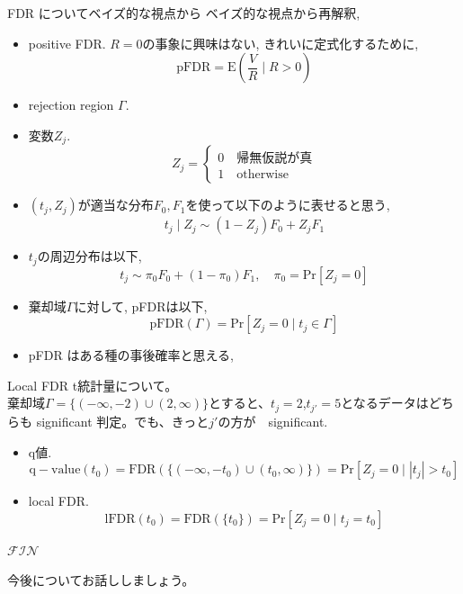 \documentclass[dvipdfmx,8pt]{beamer}
\newcommand{\probability}[1]{\mathrm{Pr}[{#1}]}
\begin{document}
  \begin{frame}{FDR についてベイズ的な視点から}
    ベイズ的な視点から再解釈,
    \begin{itemize}
      \item positive FDR. $R=0$の事象に興味はない, きれいに定式化するために,
        \[
          \mathrm{pFDR}=\mathrm{E}\left(\frac{V}{R}\mid R>0\right)
        \]
      \item rejection region $\Gamma$.
      \item 変数$Z_j$.
        \[
          Z_j=
          \begin{cases}
            0 \quad \mbox{帰無仮説が真}\\
            1 \quad \mbox{otherwise}
          \end{cases}
        \]
      \item $(t_j,Z_j)$が適当な分布$F_0,F_1$を使って以下のように表せると思う,
        \[
          t_j\mid Z_j\sim (1-Z_j)F_0+Z_jF_1
        \]
      \item $t_j$の周辺分布は以下,
        \[
          t_j\sim \pi_0F_0+(1-\pi_0)F_1,\quad \pi_0=\probability{Z_j=0}
        \]
      \item 棄却域$\Gamma$に対して, pFDRは以下,
        \[
          \mathrm{pFDR}(\Gamma)=\probability{Z_j=0\mid t_j\in\Gamma}
        \]
      \item pFDR はある種の事後確率と思える,
    \end{itemize}
  \end{frame}
  \begin{frame}{Local FDR}
    t統計量について。\\
    棄却域$\Gamma=\{(-\infty,-2)\cup(2,\infty)\}$とすると、$t_j=2$,$t_{j'}=5$となるデータはどちらも significant 判定。でも、きっと$j'$の方が　significant.\\
    \begin{itemize}
      \item q値.
        \[
          \mathrm{q-value}(t_0)=\mathrm{FDR}(\{(-\infty,-t_0)\cup(t_0,\infty)\})=\probability{Z_j=0\mid |t_j|>t_0}
        \]
      \item local FDR.
        \[
          \mathrm{lFDR}(t_0)=\mathrm{FDR}(\{t_0\})=\probability{Z_j=0\mid t_j=t_0}
        \]
    \end{itemize}
  \end{frame}
  \begin{frame}
    \centering
    $\mathcal{FIN}$
  \end{frame}
  \begin{frame}
    \centering
    今後についてお話ししましょう。
  \end{frame}
\end{document}
